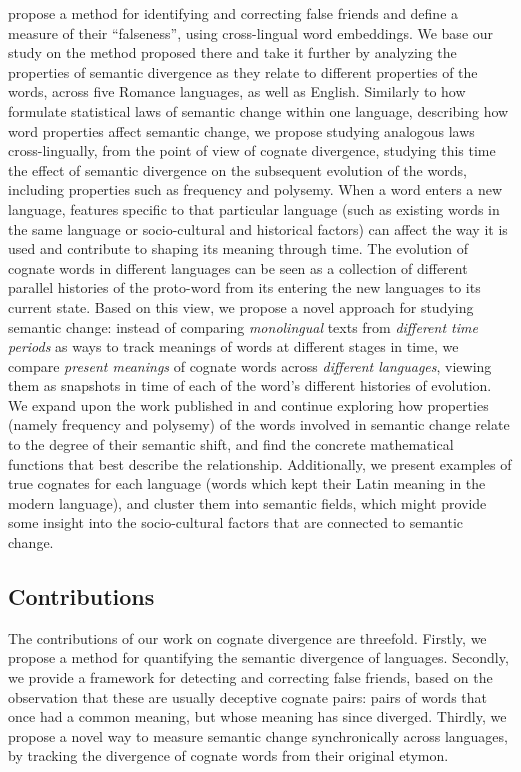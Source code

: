\documentclass[output=paper]{langsci/langscibook}
\begin{document}
\begin{sloppypar}
\citet{cognatesuban:uban2019cognates} propose a method for identifying and correcting false friends and define a measure of their ``falseness'', using cross-lingual word embeddings. We base our study on the method proposed there and take it further by analyzing the properties of semantic divergence as they relate to different properties of the words, across five Romance languages, as well as English. Similarly to how \citet{hamilton-etal-2016-diachronic} formulate statistical laws of semantic change within one language, describing how word properties affect semantic change, we propose studying analogous laws cross-lingually, from the point of view of cognate divergence, studying this time the effect of semantic divergence on the subsequent evolution of the words, including properties such as frequency and polysemy. 
When a word enters a new language, features specific to that particular language (such as existing words in the same language or socio-cultural and historical factors) can affect the way it is used and contribute to shaping its meaning through time. The evolution of cognate words in different languages can be seen as a collection of different parallel histories of the proto-word from its entering the new languages to its current state.
Based on this view, we propose a novel approach for studying semantic change: instead of comparing \textit{monolingual} texts from \textit{different time periods} as ways to track meanings of words at different stages in time, we compare \textit{present meanings} of cognate words across \textit{different languages}, viewing them as snapshots in time of each of the word's different histories of evolution. We expand upon the work published in \citet{uban-etal-2019-studying} and continue exploring how properties (namely frequency and polysemy) of the words involved in semantic change relate to the degree of their semantic shift, and find the concrete mathematical functions that best describe the relationship. Additionally, we present examples of true cognates for each language (words which kept their Latin meaning in the modern language), and cluster them into semantic fields, which might provide some insight into the socio-cultural factors that are connected to semantic change.
\end{sloppypar}

\subsection{Contributions}
\begin{sloppypar}
The contributions of our work on cognate divergence are threefold. Firstly, we propose a method for quantifying the semantic divergence of languages. Secondly, we provide a framework for detecting and correcting false friends, based on the observation that these are usually deceptive cognate pairs: pairs of words that once had a common meaning, but whose meaning has since diverged. Thirdly, we propose a novel way to measure semantic change synchronically across languages, by tracking the divergence of cognate words from their original etymon.
\end{sloppypar}
\end{document}
